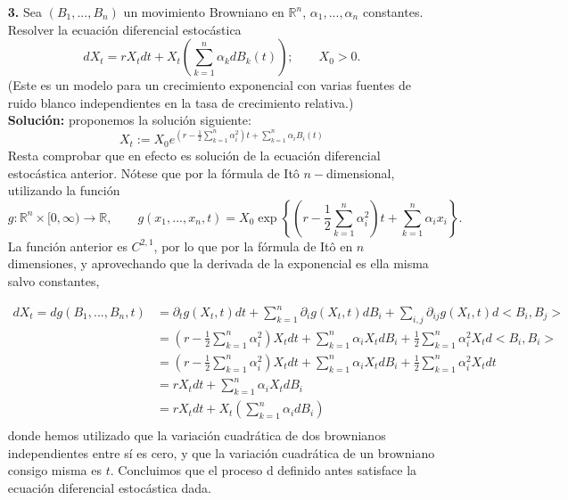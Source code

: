 \documentclass[letterpaper]{article}
\newcommand{\R}{\mathbb{R}}
\renewcommand{\to}{\rightarrow}
\newcommand{\1}{\mathds{1}}
\theoremstyle{definition}
\theoremstyle{definition}
\theoremstyle{definition}
\theoremstyle{definition}
\theoremstyle{definition}
\begin{document}
\begin{enumerate}
    \item[\textbf{3.}] Sea $(B_1,...,B_n)$ un movimiento Browniano en $\R^n$, $\alpha_1,...,\alpha_n$ 
    constantes. Resolver la ecuación diferencial estocástica 
    \[
    dX_t=rX_tdt+X_t \left(\sum_{k=1}^n \alpha_k dB_k(t)\right); \qquad X_0>0.    
    \]
    (Este es un modelo para un crecimiento exponencial con varias fuentes de ruido blanco independientes 
    en la tasa de crecimiento relativa.)\\

    \textbf{Solución:} proponemos la solución siguiente:
    \[
    X_t:=X_0e^{(r-\frac{1}{2}\sum_{k=1}^n\alpha_i^2)t+\sum_{k=1}^{n}\alpha_iB_i(t)}
    \]
    Resta comprobar que en efecto es solución de la ecuación diferencial estocástica anterior. Nótese que por 
    la fórmula de Itô $n-$dimensional, utilizando la función 
    \[
    g:\R^{n}\times[0,\infty)\to \R, \qquad g(x_1,...,x_n,t)=X_0\exp \left\{\left(r-\frac{1}{2}\sum_{k=1}^n\alpha_i^2\right)t+\sum_{k=1}^{n}\alpha_ix_i\right\}.
    \]
    La función anterior es $C^{2,1}$, por lo que por la fórmula de Itô en $n$ dimensiones, y aprovechando que la derivada de la exponencial 
    es ella misma salvo constantes,
    
    \begin{align*}
        dX_t=dg(B_1,...,B_n,t)&=\partial_tg(X_t,t)dt+\sum_{k=1}^{n}\partial_ig(X_t,t)dB_i+\sum_{i,j}\partial_{ij}g(X_t,t)d<B_i,B_j>\\
        &=\left(r-\frac{1}{2}\sum_{k=1}^n\alpha_i^2\right)X_t dt + \sum_{k=1}^{n}\alpha_iX_tdB_i+\frac{1}{2}\sum_{k=1}^{n}\alpha_i^2X_td<B_i,B_i>\\
        &=\left(r-\frac{1}{2}\sum_{k=1}^n\alpha_i^2\right)X_t dt + \sum_{k=1}^{n}\alpha_iX_tdB_i+\frac{1}{2}\sum_{k=1}^{n}\alpha_i^2X_tdt\\
        &=rX_t dt + \sum_{k=1}^{n}\alpha_iX_tdB_i\\
        &=rX_t dt + X_t \left(\sum_{k=1}^{n}\alpha_idB_i\right)\\
    \end{align*}
    donde hemos utilizado que la variación cuadrática de dos brownianos independientes entre sí es cero, 
    y que la variación cuadrática de un browniano consigo misma es $t$. Concluimos que el proceso d
    definido antes satisface la ecuación diferencial estocástica dada.
    

\end{enumerate}
\end{document}
